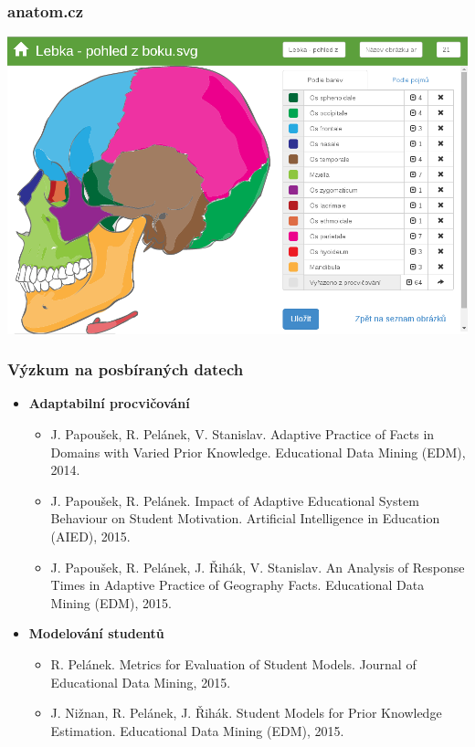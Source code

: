 \documentclass[xcolor=svgnames]{beamer}
\begin{document}
\begin{frame}
	\frametitle{anatom.cz}
	 
   \includegraphics[width=\textwidth]{img/anatomie.png}
\end{frame}
\begin{frame}
	\frametitle{Výzkum na posbíraných datech}

  \begin{itemize}
   \item \textbf{Adaptabilní procvičování}

  \begin{itemize}
   \item J. Papoušek, R. Pelánek, V. Stanislav. Adaptive Practice of Facts in Domains with Varied Prior Knowledge. Educational Data Mining (EDM), 2014.
   \item J. Papoušek, R. Pelánek. Impact of Adaptive Educational System Behaviour on Student Motivation. Artificial Intelligence in Education (AIED), 2015.
   \item J. Papoušek, R. Pelánek, J. Řihák, V. Stanislav. An Analysis of Response Times in Adaptive Practice of Geography Facts. Educational Data Mining (EDM), 2015.
  \end{itemize}

   \item \textbf{Modelování studentů }

  \begin{itemize}
   \item R. Pelánek. Metrics for Evaluation of Student Models. Journal of Educational Data Mining, 2015.
   \item J. Nižnan, R. Pelánek, J. Řihák. Student Models for Prior Knowledge Estimation. Educational Data Mining (EDM), 2015.
  \end{itemize}
  \end{itemize}

\end{frame}
\end{document}

